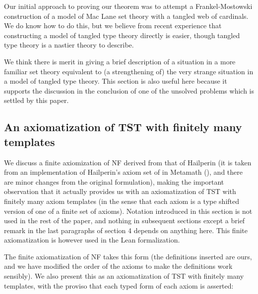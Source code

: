 \documentclass[112pt]{article}
\begin{document}
Our initial approach to proving our theorem was to attempt a Frankel-Mostowski construction of a model of Mac Lane set theory with a tangled web of cardinals.  We do know how to do this, but we believe from recent experience that constructing a model of tangled type theory directly is easier, though tangled type theory is a nastier theory to describe.

We think there is merit in giving a brief description of a situation in a more familiar set theory equivalent to (a strengthening of) the very strange situation in a model of tangled type theory.  This section is also useful here because it supports the discussion in the conclusion of one of the unsolved problems which is settled by this paper.

\newpage

\subsection{An axiomatization of TST with finitely many templates}

We discuss a finite axiomization of NF derived from that of Hailperin (it is taken from an implementation of Hailperin's axiom set of \cite{hailperin} in Metamath (\cite{metamath}), and there are minor changes from the original formulation), making the important observation that it actually provides us with an axiomatization of TST with finitely many
axiom templates (in the sense that each axiom is a type shifted version of one of a finite set of axioms).  Notation introduced in this section is not used in the rest of the paper, and nothing in subsequent sections except a brief remark in the last paragraphs of section 4 depends on anything here.  This finite axiomatization is however used in the Lean formalization.

The finite axiomatization of NF takes this form (the definitions inserted are ours, and we have modified the order of the axioms to make the definitions work sensibly).  We also present this as an axiomatization of TST with finitely many templates, with the proviso that each typed form of each axiom is asserted:
\end{document}
